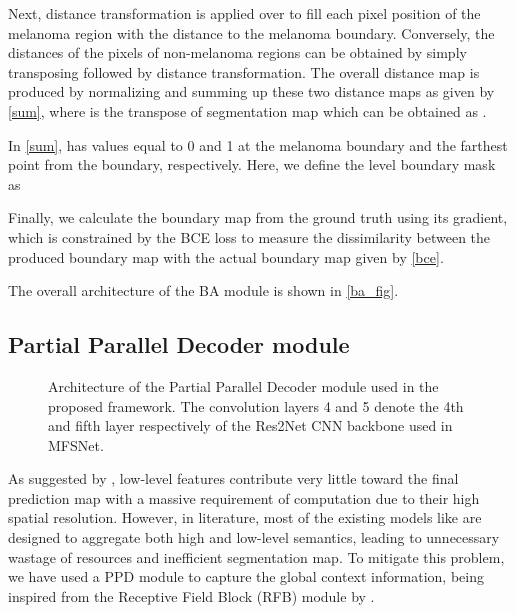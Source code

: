 \documentclass[review]{elsarticle}
\begin{document}
Next, distance transformation \cite{fabbri20082d} is applied over  to fill each pixel position of the melanoma region with the distance to the melanoma boundary. Conversely, the distances of the pixels of non-melanoma regions can be obtained by simply transposing  followed by distance transformation. The overall distance map is produced by normalizing and summing up these two distance maps as given by \autoref{sum}, where  is the transpose of segmentation map  which can be obtained as .



 In \autoref{sum},  has values equal to 0 and 1 at the melanoma boundary and the farthest point from the boundary, respectively. Here, we define the  level boundary mask  as



Finally, we calculate the boundary map  from the ground truth using its gradient, which is constrained by the BCE loss to measure the dissimilarity between the produced boundary map  with the actual boundary map  given by \autoref{bce}.

The overall architecture of the BA module is shown in \autoref{ba_fig}.


\subsection{Partial Parallel Decoder module}\label{PPD}
\begin{figure*}
\centering
    \caption{Architecture of the Partial Parallel Decoder module used in the proposed framework. The convolution layers 4 and 5 denote the 4th and fifth layer respectively of the Res2Net CNN backbone used in MFSNet.}
    \label{ppdfig}
\end{figure*}

As suggested by \cite{wu2019cascaded}, low-level features contribute very little toward the final prediction map with a massive requirement of computation due to their high spatial resolution. However, in literature, most of the existing models like \cite{zhou2018unet++,gu2019net} are designed to aggregate both high and low-level semantics, leading to unnecessary wastage of resources and inefficient segmentation map. To mitigate this problem, we have used a PPD module to capture the global context information, being inspired from the Receptive Field Block (RFB) module by \cite{liu2018receptive}. 
\end{document}
